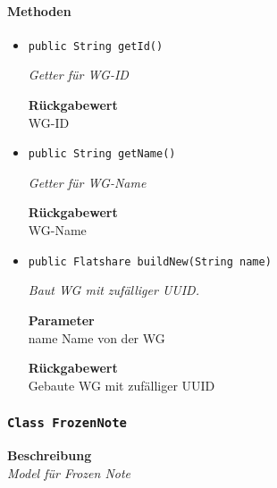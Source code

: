      \paragraph*{Methoden}
     \begin{itemize}
     	\item{\texttt{public String getId()}}
     	
     	\textit{Getter für WG-ID}
     	
     	
     	
     	\textbf{Rückgabewert} \\
     	WG-ID        \item{\texttt{public String getName()}}
     	
     	\textit{Getter für WG-Name}
     	
     	
     	
     	\textbf{Rückgabewert} \\
     	WG-Name        \item{\texttt{public Flatshare buildNew(String name)}}
     	
     	\textit{Baut WG mit zufälliger UUID.}
     	
     	\textbf{Parameter} \\
     	name Name von der WG
     	
     	\textbf{Rückgabewert} \\
     	Gebaute WG mit zufälliger UUID
     \end{itemize}
     \subsubsection{\texttt{Class FrozenNote}}
     \textbf{Beschreibung} \\
     \textit{Model für Frozen Note}
